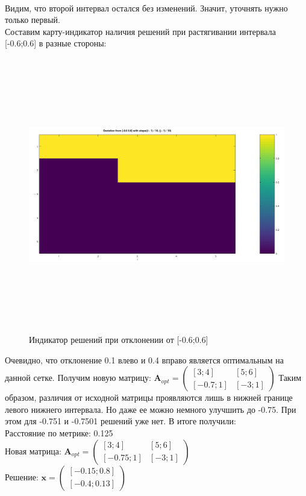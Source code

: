 \documentclass[../body.tex]{subfiles}
\begin{document}
\\Видим, что второй интервал остался без изменений. Значит, уточнять нужно только первый.
\\Составим карту-индикатор наличия решений при растягивании интервала [-0.6;0.6] в разные стороны:
\begin{figure}[H]
    \centering
    \includegraphics[width=16cm, height=12cm]{dev_from_06.png}
    \caption{Индикатор решений при отклонении от [-0.6;0.6]}
    \label{solve_06}
\end{figure}
Очевидно, что отклонение 0.1 влево и 0.4 вправо является оптимальным на данной сетке. Получим новую матрицу: $\textbf{A}_{opt} = \begin{pmatrix}
        [3;4]& [5;6]\\
        [-0.7;1]& [-3;1]
        \end{pmatrix}$
Таким образом, различия от исходной матрицы проявляются лишь в нижней границе левого нижнего интервала. Но даже ее можно немного улучшить до -0.75. При этом для -0.751 и -0.7501 решений уже нет. В итоге получили:
\\Расстояние по метрике: 0.125
\\Новая матрица: $\textbf{A}_{opt} = \begin{pmatrix}
        [3;4]& [5;6]\\
        [-0.75;1]& [-3;1]
        \end{pmatrix}$
\\Решение: $\textbf{x} = \begin{pmatrix}
        [-0.15;0.8]\\
        [-0.4;0.13]
        \end{pmatrix}$
\end{document}
